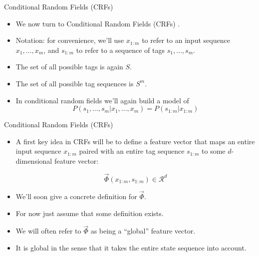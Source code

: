 \documentclass[handout]{beamer}
\begin{document}
\begin{frame}{Conditional Random Fields (CRFs)}
\begin{scriptsize}

\begin{itemize}

\item  We now turn to Conditional Random Fields (CRFs) \cite{LaffertyMP01}.

\item Notation: for convenience, we'll use $x_{1:m}$ to refer to an input sequence $x_1 ,\dots,x_m$, and $s_{1:m}$ to refer to a sequence of tags $s_1, \dots, s_m$.

\item The set of all possible tags is again $S$.

\item The set of all possible tag sequences is $S^m$.

\item In conditional random fields we'll again build a model of
\begin{displaymath}
 P(s_1, \dots, s_m | x_1, \dots, x_m) = P(s_{1:m}|x_{1:m})
\end{displaymath}


\end{itemize}

\end{scriptsize}
\end{frame}

\begin{frame}{Conditional Random Fields (CRFs)}
\begin{scriptsize}

\begin{itemize}

\item A first key idea in CRFs will be to define a feature vector  that maps an entire input sequence $x_{1:m}$ paired with an entire tag sequence $s_{1:m}$ to some $d$-dimensional feature vector:

\begin{displaymath}
 \vec{\Phi}(x_{1:m},s_{1:m}) \in \mathcal{R}^d
\end{displaymath}

\item We'll soon give a concrete definition for $\vec{\Phi}$.
\item  For now just assume that some definition exists. 
\item We will often refer to $\vec{\Phi}$ as being a ``global'' feature vector.
\item It is global in the sense that it takes the entire state
sequence into account.

\end{itemize}

\end{scriptsize}
\end{frame}
\end{document}
